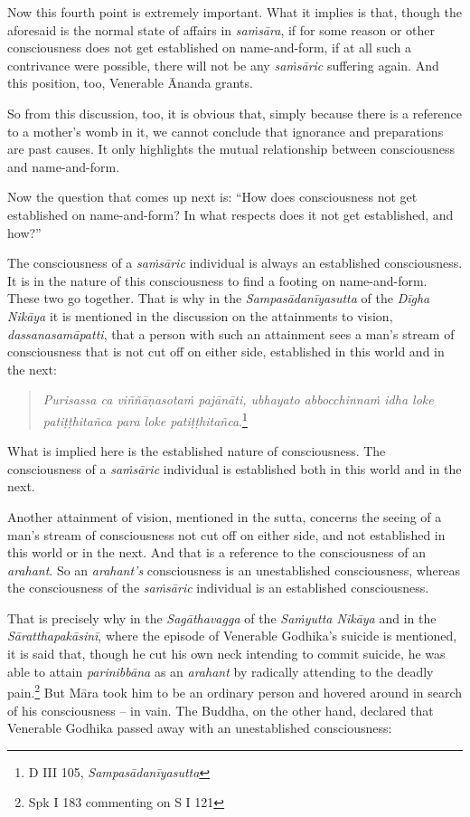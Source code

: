 Now this fourth point is extremely important. What it implies is that, though the aforesaid is the normal state of affairs in \emph{saṁsāra}, if for some reason or other consciousness does not get established on name-and-form, if at all such a contrivance were possible, there will not be any \emph{saṁsāric} suffering again. And this position, too, Venerable Ānanda grants.

So from this discussion, too, it is obvious that, simply because there is a reference to a mother's womb in it, we cannot conclude that ignorance and preparations are past causes. It only highlights the mutual relationship between consciousness and name-and-form.

Now the question that comes up next is: ``How does consciousness not get established on name-and-form? In what respects does it not get established, and how?''

The consciousness of a \emph{saṁsāric} individual is always an established consciousness. It is in the nature of this consciousness to find a footing on name-and-form. These two go together. That is why in the \emph{Sampasādanīyasutta} of the \emph{Dīgha Nikāya} it is mentioned in the discussion on the attainments to vision, \emph{dassanasamāpatti}, that a person with such an attainment sees a man's stream of consciousness that is not cut off on either side, established in this world and in the next:

\begin{quote}
\emph{Purisassa ca viññāṇasotaṁ pajānāti, ubhayato abbocchinnaṁ idha loke patiṭṭhitañca para loke patiṭṭhitañca}.\footnote{D III 105, \emph{Sampasādanīyasutta}}
\end{quote}

What is implied here is the established nature of consciousness. The consciousness of a \emph{saṁsāric} individual is established both in this world and in the next.

Another attainment of vision, mentioned in the sutta, concerns the seeing of a man's stream of consciousness not cut off on either side, and not established in this world or in the next. And that is a reference to the consciousness of an \emph{arahant}. So an \emph{arahant's} consciousness is an unestablished consciousness, whereas the consciousness of the \emph{saṁsāric} individual is an established consciousness.

That is precisely why in the \emph{Sagāthavagga} of the \emph{Saṁyutta Nikāya} and in the \emph{Sāratthapakāsinī}, where the episode of Venerable Godhika's suicide is mentioned, it is said that, though he cut his own neck intending to commit suicide, he was able to attain \emph{parinibbāna} as an \emph{arahant} by radically attending to the deadly pain.\footnote{Spk I 183 commenting on S I 121} But Māra took him to be an ordinary person and hovered around in search of his consciousness -- in vain. The Buddha, on the other hand, declared that Venerable Godhika passed away with an unestablished consciousness:

